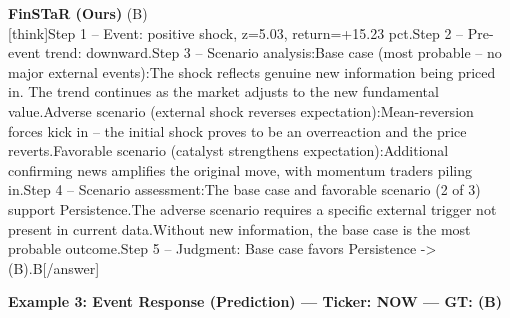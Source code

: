 \begin{minipage}[t]{0.41\textwidth}
\colorbox{green!10}{\parbox{\dimexpr\textwidth-2\fboxsep}{
\textbf{FinSTaR (Ours)} \textcolor{green!50!black}{(B)} \\[2pt]
\tiny
[think]\newline Step 1 -- Event: positive shock, z=5.03, return=+15.23 pct.\newline Step 2 -- Pre-event trend: downward.\newline Step 3 -- Scenario analysis:\newline   Base case (most probable -- no major external events):\newline     The shock reflects genuine new information being priced in. The trend continues as the market adjusts to the new fundamental value.\newline   Adverse scenario (external shock reverses expectation):\newline     Mean-reversion forces kick in -- the initial shock proves to be an overreaction and the price reverts.\newline   Favorable scenario (catalyst strengthens expectation):\newline     Additional confirming news amplifies the original move, with momentum traders piling in.\newline Step 4 -- Scenario assessment:\newline   The base case and favorable scenario (2 of 3) support Persistence.\newline   The adverse scenario requires a specific external trigger not present in current data.\newline   Without new information, the base case is the most probable outcome.\newline Step 5 -- Judgment: Base case favors Persistence -> (B).\newline [/think]\newline [answer]B[/answer]
}}
\end{minipage}
\vspace{8pt}


\noindent
\textbf{Example 3: Event Response (Prediction) --- Ticker: NOW --- GT: (B)}
\vspace{2pt}

